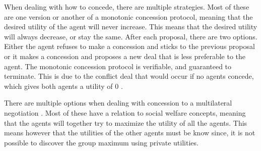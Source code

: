 \begin{figure}
\end{figure}
When dealing with how to concede, there are multiple strategies. Most of these are one version or another of a monotonic concession protocol, meaning that the desired utility of the agent will never increase. This means that the desired utility will always decrease, or stay the same. After each proposal, there are two options. Either the agent refuses to make a concession and sticks to the previous proposal or it makes a concession and proposes a new deal that is less preferable to the agent. The monotonic concession protocol is verifiable, and guaranteed to terminate. This is due to the conflict deal that would occur if no agents concede, which gives both agents a utility of 0 \citep{endriss2006monotonic}.


There are multiple options when dealing with concession to a multilateral negotiation \citep{endriss2006monotonic}. Most of these have a relation to social welfare concepts, meaning that the agents will together try to maximize the utility of all the agents. This means however that the utilities of the other agents must be know since, it is not possible to discover the group maximum using private utilities.


